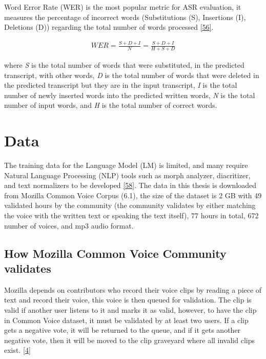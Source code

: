 \documentclass[
  a4paper,
]{article}
\begin{document}
Word Error Rate (WER) is the most popular metric for ASR evaluation, it
measures the percentage of incorrect words (Substitutions (S),
Insertions (I), Deletions (D)) regarding the total number of words
processed \protect\hyperlink{ref-ERRATTAHI201832}{{[}56{]}}.

\begin{align}
WER = \frac{S + D + I}{N} = \frac{S + D + I}{H + S + D}
\end{align}

where \emph{S} is the total number of words that were substituted, in
the predicted transcript, with other words, \emph{D} is the total number
of words that were deleted in the predicted transcript but they are in
the input transcript, \emph{I} is the total number of newly inserted
words into the predicted written words, \emph{N} is the total number of
input words, and \emph{H} is the total number of correct words.

\newpage

\hypertarget{data}{%
\section{Data}\label{data}}

The training data for the Language Model (LM) is limited, and many
require Natural Language Processing (NLP) tools such as morph analyzer,
diacritizer, and text normalizers to be developed
\protect\hyperlink{ref-Abdou_Moussa_2018}{{[}58{]}}. The data in this
thesis is downloaded from Mozilla Common Voice Corpus (6.1), the size of
the dataset is 2 GB with 49 validated hours by the community (the
community validates by either matching the voice with the written text
or speaking the text itself), 77 hours in total, 672 number of voices,
and mp3 audio format.

\hypertarget{how-mozilla-common-voice-community-validates}{%
\subsection{How Mozilla Common Voice Community
validates}\label{how-mozilla-common-voice-community-validates}}

Mozilla depends on contributors who record their voice clips by reading
a piece of text and record their voice, this voice is then queued for
validation. The clip is valid if another user listens to it and marks it
as valid, however, to have the clip in Common Voice dataset, it must be
validated by at least two users. If a clip gets a negative vote, it will
be returned to the queue, and if it gets another negative vote, then it
will be moved to the clip graveyard where all invalid clips exist.
\protect\hyperlink{ref-Mozilla}{{[}4{]}}
\end{document}
